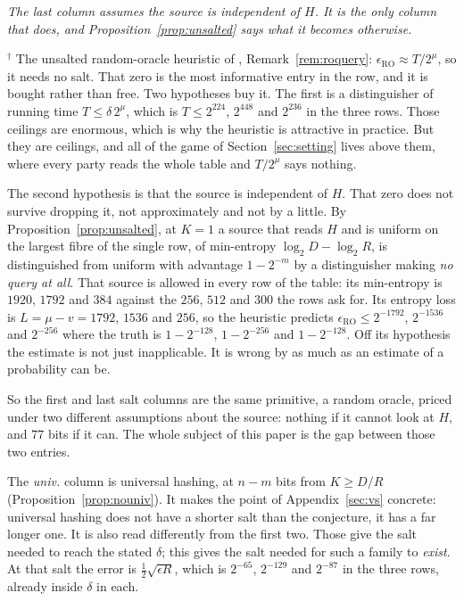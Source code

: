 \documentclass{aicr-solution}
\begin{document}
\noindent\emph{The last column assumes the source is independent of $H$. It is the only column that
does, and Proposition~\ref{prop:unsalted} says what it becomes otherwise.}

\smallskip
\noindent$^{\dagger}$ The unsalted random-oracle heuristic of \cite{BDKPPSY11}, Remark~\ref{rem:roquery}:
$\epsilon_{\mathrm{RO}} \approx T/2^{\mu}$, so it needs no salt. That zero is the most informative
entry in the row, and it is bought rather than free. Two hypotheses buy it. The first is a
distinguisher of running time $T \le \delta\,2^{\mu}$, which is $T \le 2^{224}$, $2^{448}$ and
$2^{236}$ in the three rows. Those ceilings are enormous, which is why the heuristic is attractive
in practice. But they are ceilings, and all of the game of Section~\ref{sec:setting} lives above them, where every
party reads the whole table and $T/2^{\mu}$ says nothing.

The second hypothesis is that the source is independent of $H$. That zero does not survive dropping
it, not approximately and not by a little. By Proposition~\ref{prop:unsalted}, at $K = 1$ a source
that reads $H$ and is uniform on the largest fibre of the single row, of min-entropy
$\log_2 D - \log_2 R$, is distinguished from uniform with advantage $1 - 2^{-m}$ by a distinguisher
making \emph{no query at all}. That source is allowed in every row of the table: its min-entropy is
$1920$, $1792$ and $384$ against the $256$, $512$ and $300$ the rows ask for. Its entropy loss is
$L = \mu - v = 1792$, $1536$ and $256$, so the heuristic predicts
$\epsilon_{\mathrm{RO}} \le 2^{-1792}$, $2^{-1536}$ and $2^{-256}$ where the truth is
$1 - 2^{-128}$, $1 - 2^{-256}$ and $1 - 2^{-128}$. Off its hypothesis the estimate is not just
inapplicable. It is wrong by as much as an estimate of a probability can be.

So the first and last salt columns are the same primitive, a random oracle, priced under two
different assumptions about the source: nothing if it cannot look at $H$, and $77$ bits if it can.
The whole subject of this paper is the gap between those two entries.

The \emph{univ.} column is universal hashing, at $n - m$ bits from $K \ge D/R$
(Proposition~\ref{prop:nouniv}). It makes the point of Appendix~\ref{sec:vs} concrete: universal
hashing does not have a shorter salt than the conjecture, it has a far longer one. It is also read
differently from the first two. Those give the salt needed to reach the stated $\delta$; this gives
the salt needed for such a family to \emph{exist}. At that salt the error is
$\tfrac12\sqrt{\epsilon R}$, which is $2^{-65}$, $2^{-129}$ and $2^{-87}$ in the three rows, already
inside $\delta$ in each.
\end{document}
